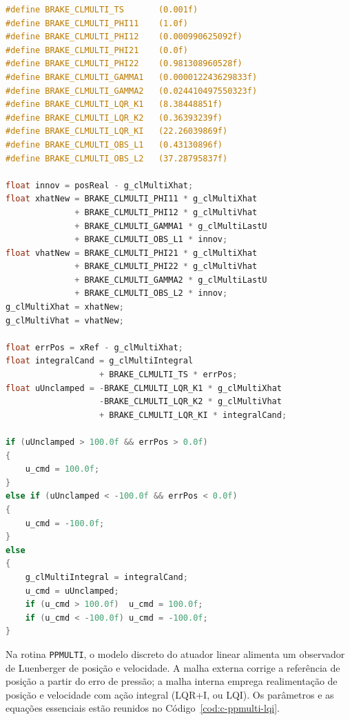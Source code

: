 \begin{lstlisting}[language=C,caption={Modelo discreto, observador e lei LQI no ensaio CLMULTI.},label={cod:c-clmulti-lqi}]
#define BRAKE_CLMULTI_TS       (0.001f)
#define BRAKE_CLMULTI_PHI11    (1.0f)
#define BRAKE_CLMULTI_PHI12    (0.000990625092f)
#define BRAKE_CLMULTI_PHI21    (0.0f)
#define BRAKE_CLMULTI_PHI22    (0.981308960528f)
#define BRAKE_CLMULTI_GAMMA1   (0.000012243629833f)
#define BRAKE_CLMULTI_GAMMA2   (0.024410497550323f)
#define BRAKE_CLMULTI_LQR_K1   (8.38448851f)
#define BRAKE_CLMULTI_LQR_K2   (0.36393239f)
#define BRAKE_CLMULTI_LQR_KI   (22.26039869f)
#define BRAKE_CLMULTI_OBS_L1   (0.43130896f)
#define BRAKE_CLMULTI_OBS_L2   (37.28795837f)

float innov = posReal - g_clMultiXhat;
float xhatNew = BRAKE_CLMULTI_PHI11 * g_clMultiXhat
              + BRAKE_CLMULTI_PHI12 * g_clMultiVhat
              + BRAKE_CLMULTI_GAMMA1 * g_clMultiLastU
              + BRAKE_CLMULTI_OBS_L1 * innov;
float vhatNew = BRAKE_CLMULTI_PHI21 * g_clMultiXhat
              + BRAKE_CLMULTI_PHI22 * g_clMultiVhat
              + BRAKE_CLMULTI_GAMMA2 * g_clMultiLastU
              + BRAKE_CLMULTI_OBS_L2 * innov;
g_clMultiXhat = xhatNew;
g_clMultiVhat = vhatNew;

float errPos = xRef - g_clMultiXhat;
float integralCand = g_clMultiIntegral
                   + BRAKE_CLMULTI_TS * errPos;
float uUnclamped = -BRAKE_CLMULTI_LQR_K1 * g_clMultiXhat
                   -BRAKE_CLMULTI_LQR_K2 * g_clMultiVhat
                   + BRAKE_CLMULTI_LQR_KI * integralCand;

if (uUnclamped > 100.0f && errPos > 0.0f)
{
    u_cmd = 100.0f;
}
else if (uUnclamped < -100.0f && errPos < 0.0f)
{
    u_cmd = -100.0f;
}
else
{
    g_clMultiIntegral = integralCand;
    u_cmd = uUnclamped;
    if (u_cmd > 100.0f)  u_cmd = 100.0f;
    if (u_cmd < -100.0f) u_cmd = -100.0f;
}
\end{lstlisting}

Na rotina \texttt{PPMULTI}, o modelo discreto do atuador linear alimenta um observador de Luenberger de posição e velocidade. A malha externa corrige a referência de posição a partir do erro de pressão; a malha interna emprega realimentação de posição e velocidade com ação integral (LQR+I, ou LQI). Os parâmetros e as equações essenciais estão reunidos no Código~\ref{cod:c-ppmulti-lqi}.

